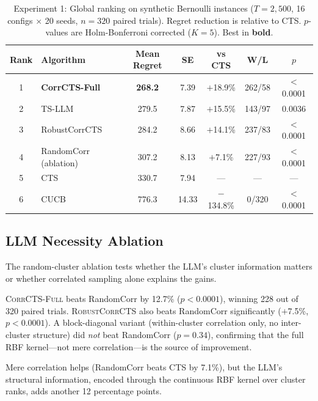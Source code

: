 \documentclass{article}
\theoremstyle{plain}
\theoremstyle{definition}
\theoremstyle{remark}
\newcommand{\CorrFull}{\textsc{CorrCTS-Full}}
\newcommand{\RobustCorr}{\textsc{RobustCorrCTS}}
\begin{document}
\begin{table}[t]
\caption{Experiment 1: Global ranking on synthetic Bernoulli instances ($T{=}2{,}500$, 16 configs $\times$ 20 seeds, $n{=}320$ paired trials). Regret reduction is relative to CTS. $p$-values are Holm-Bonferroni corrected ($K{=}5$). Best in \textbf{bold}.}
\label{tab:global}
\centering
\small
\begin{tabular}{@{}clccccc@{}}
\toprule
Rank & Algorithm & Mean Regret & SE & vs CTS & W/L & $p$ \\
\midrule
1 & \textbf{CorrCTS-Full} & \textbf{268.2} & 7.39 & $+$18.9\% & 262/58 & ${<}$0.0001 \\
2 & TS-LLM \citep{sun2025tsllm} & 279.5 & 7.87 & $+$15.5\% & 143/97 & 0.0036 \\
3 & RobustCorrCTS & 284.2 & 8.66 & $+$14.1\% & 237/83 & ${<}$0.0001 \\
4 & RandomCorr (ablation) & 307.2 & 8.13 & $+$7.1\% & 227/93 & ${<}$0.0001 \\
5 & CTS \citep{wang2018cts} & 330.7 & 7.94 & --- & --- & --- \\
6 & CUCB \citep{chen2013cucb} & 776.3 & 14.33 & $-$134.8\% & 0/320 & ${<}$0.0001 \\
\bottomrule
\end{tabular}
\end{table}

\subsection{LLM Necessity Ablation}\label{sec:ablation}

The random-cluster ablation tests whether the LLM's cluster information matters or whether correlated sampling alone explains the gains.

\CorrFull{} beats RandomCorr by 12.7\% ($p < 0.0001$), winning 228 out of 320 paired trials.
\RobustCorr{} also beats RandomCorr significantly ($+$7.5\%, $p < 0.0001$).
A block-diagonal variant (within-cluster correlation only, no inter-cluster structure) did \emph{not} beat RandomCorr ($p = 0.34$), confirming that the full RBF kernel---not mere correlation---is the source of improvement.

Mere correlation helps (RandomCorr beats CTS by 7.1\%), but the LLM's structural information, encoded through the continuous RBF kernel over cluster ranks, adds another 12 percentage points.
\end{document}
